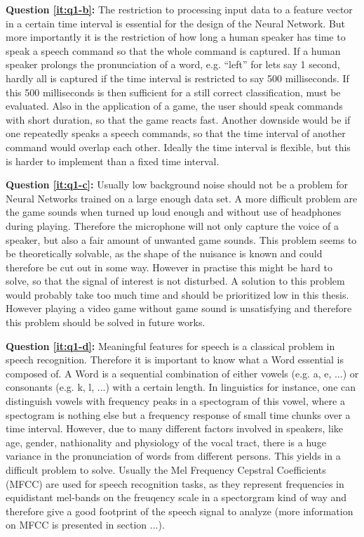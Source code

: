 \textbf{Question \ref{it:q1-b}:} 
The restriction to processing input data to a feature vector in a certain time interval is essential for the design of the Neural Network.
But more importantly it is the restriction of how long a human speaker has time to speak a speech command so that the whole command is captured. If a human speaker prolongs the pronunciation of a word, e.g. \enquote{left} for lets say 1 second, hardly all is captured if the time interval is restricted to say 500 milliseconds. If this 500 milliseconds is then sufficient for a still correct classification, must be evaluated. 
Also in the application of a game, the user should speak commands with short duration, so that the game reacts fast. Another downside would be if one repeatedly speaks a speech commands, so that the time interval of another command would overlap each other. Ideally the time interval is flexible, but this is harder to implement than a fixed time interval.

\textbf{Question \ref{it:q1-c}:}
Usually low background noise should not be a problem for Neural Networks trained on a large enough data set. 
A more difficult problem are the game sounds when turned up loud enough and without use of headphones during playing. 
Therefore the microphone will not only capture the voice of a speaker, but also a fair amount of unwanted game sounds. 
This problem seems to be theoretically solvable, as the shape of the nuisance is known and could therefore be cut out in some way. 
However in practise this might be hard to solve, so that the signal of interest is not disturbed. 
A solution to this problem would probably take too much time and should be prioritized low in this thesis. 
However playing a video game without game sound is unsatisfying and therefore this problem should be solved in future works.

\textbf{Question \ref{it:q1-d}:} 
Meaningful features for speech is a classical problem in speech recognition.
Therefore it is important to know what a Word essential is composed of. A Word is a sequential combination of either vowels (e.g. a, e, ...) or consonants (e.g. k, l, ...) with a certain length. In linguistics for instance, one can distinguish vowels with frequency peaks in a spectogram of this vowel, where a spectogram is nothing else but a frequency response of small time chunks over a time interval. 
However, due to many different factors involved in speakers, like age, gender, nathionality and physiology of the vocal tract, there is a huge variance in the pronunciation of words from different persons. 
This yields in a difficult problem to solve. 
Usually the Mel Frequency Cepstral Coefficients (MFCC) are used for speech recognition tasks, as they represent frequencies in equidistant mel-bands on the freuqency scale in a spectorgram kind of way and therefore give a good footprint of the speech signal to analyze (more information on MFCC is presented in section ...).
